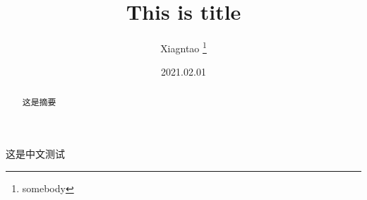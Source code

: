 \documentclass[12pt, a4paper]{article}
\title{This is title}
\author{Xiagntao \thanks{somebody} }
\date{2021.02.01}
\begin{document}
  
\begin{titlepage}
    \maketitle
\end{titlepage}

\tableofcontents

\begin{abstract}
这是摘要
\end{abstract}

\newpage
这是中文测试
\end{document}
